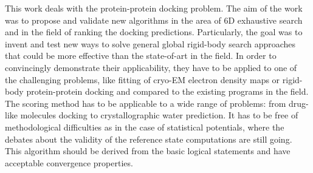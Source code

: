 This work deals with the protein-protein docking problem. The aim of the work was to propose and validate new algorithms in the area of 6D exhaustive
search and in the field of ranking the docking predictions. Particularly, the goal was to invent and test new ways to solve general global rigid-body search approaches that
could be more effective than the state-of-art in the field. In order to convincingly demonstrate their applicability, they have to be applied 
to one of the challenging problems, like fitting of cryo-EM electron density maps or rigid-body protein-protein docking and compared to the 
existing programs in the field.
The scoring method has to be applicable to a wide range of problems: from drug-like molecules docking to crystallographic water prediction.
It has to be free of methodological difficulties as in the case of statistical potentials, where the debates about the validity of the reference state 
computations are still going. This algorithm should be derived from the basic logical statements and have acceptable convergence properties.